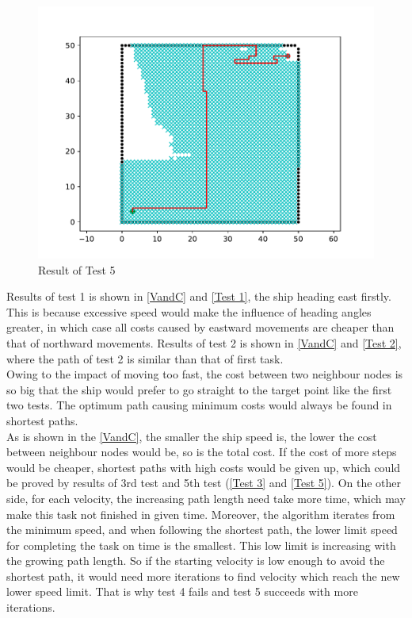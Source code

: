 \begin{figure}
    \centering  
	\includegraphics[width=0.9\linewidth]{100.pdf}  
	\caption{Result of Test 5}
    \label{Test 5}
\end{figure}
\noindent Results of test 1 is shown in \autoref{VandC} and \autoref{Test 1}, the ship heading east firstly. This is because excessive speed would make the influence of heading angles greater, in which case all costs caused by eastward movements are cheaper than that of northward movements. Results of test 2 is shown in \autoref{VandC} and \autoref{Test 2}, where the path of test 2 is similar than that of first task. 
\\Owing to the impact of moving too fast, the cost between two neighbour nodes is so big that the ship would prefer to go straight to the target point like the first two tests. The optimum path causing minimum costs would always be found in shortest paths.
\\As is shown in the \autoref{VandC}, the smaller the ship speed is, the lower the cost between neighbour nodes would be, so is the total cost. If the cost of more steps would be cheaper, shortest paths with high costs would be given up, which could be proved by results of 3rd test and 5th test (\autoref{Test 3} and \autoref{Test 5}). On the other side, for each velocity, the increasing path length need take more time, which may make this task not finished in given time. Moreover, the algorithm iterates from the minimum speed, and  when following the shortest path, the lower limit speed for completing the task on time is the smallest. This low limit is increasing with the growing path length. So if the starting velocity is low enough to avoid the shortest path, it would need more iterations to find velocity which reach the new lower speed limit. That is why test 4 fails and test 5 succeeds with more iterations.
